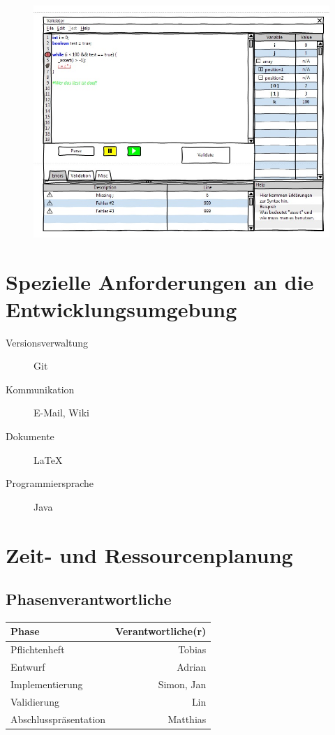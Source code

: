 \documentclass[a4paper,10pt]{article}
\begin{document}
\begin{figure}
\includegraphics[width=\textwidth]{images/mockup3.jpg}
\end{figure}

\section{Spezielle Anforderungen an die Entwicklungsumgebung}
\begin{description}
  \item[Versionsverwaltung] Git
  \item[Kommunikation] E-Mail, Wiki
  \item[Dokumente] \LaTeX
  \item[Programmiersprache] Java
\end{description}

\section{Zeit- und Ressourcenplanung}
\subsection{Phasenverantwortliche}
\begin{tabular}[h]{| l | r |}
\hline
\textbf{Phase} & \textbf{Verantwortliche(r)}\\
\hline
Pflichtenheft & Tobias\\
\hline
Entwurf & Adrian\\
\hline
Implementierung & Simon, Jan\\
\hline
Validierung & Lin\\
\hline
Abschlusspräsentation & Matthias\\
\hline
\end{tabular}
\end{document}
